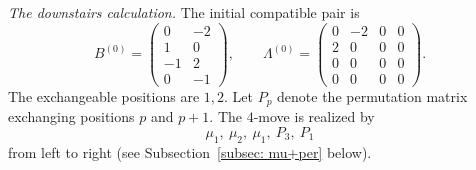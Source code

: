 \documentclass[12pt, leqno]{amsart}
\numberwithin{equation}{section}
\theoremstyle{plain}
\theoremstyle{definition}
\begin{document}
\smallskip
\noindent\emph{The downstairs calculation.}
The initial compatible pair is
\[
B^{(0)} = \left(
\begin{array}{cc}
0&-2\\
1&0\\ \hline
-1&2\\
0&-1
\end{array}
\right),
\qquad
\Lambda^{(0)}
=
\left(
\begin{array}{cc|cc}
0&-2&0&0\\
2&0&0&0\\ \hline
0&0&0&0\\
0&0&0&0
\end{array}
\right).
\]
The exchangeable positions are $1,2$.
Let $P_p$ denote the permutation matrix exchanging positions $p$ and $p+1$.
The $4$-move is realized by
\[
\mu_1,\ \mu_2,\ \mu_1,\ P_3,\ P_1
\]
from left to right (see Subsection~\ref{subsec: mu+per} below).
\end{document}
